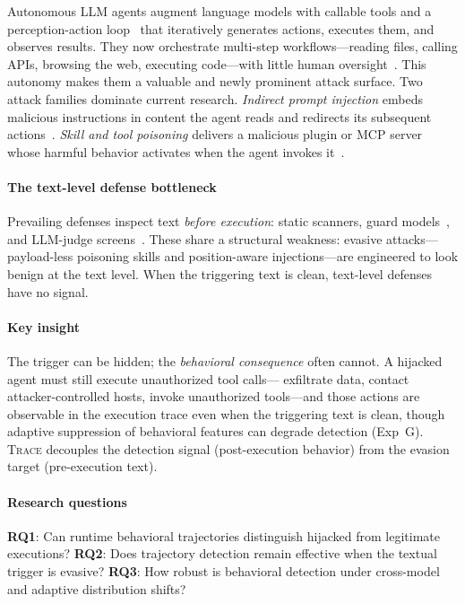 \documentclass[conference]{IEEEtran}
\begin{document}
Autonomous LLM agents augment language models with callable tools and
a perception-action loop~\cite{schick2023toolformer,yao2023react,
guo2024survey} that iteratively generates actions, executes them, and
observes results.  They now orchestrate multi-step workflows---reading
files, calling APIs, browsing the web, executing code---with little
human oversight~\cite{wang2024survey}.  This autonomy
makes them a valuable and newly prominent attack surface.  Two attack
families dominate current research.  \emph{Indirect prompt injection}
embeds malicious instructions in content the agent reads and redirects
its subsequent actions~\cite{greshake2023not,perez2022ignore,
zhan2024injectagent}.  \emph{Skill and tool poisoning} delivers a
malicious plugin or MCP server whose harmful behavior activates when
the agent invokes it~\cite{shi2024badagent,yang2024watch}.

\paragraph{The text-level defense bottleneck}
Prevailing defenses inspect text \emph{before execution}: static
scanners, guard models~\cite{inan2023llama}, and LLM-judge
screens~\cite{yi2023benchmarking}.  These share a structural weakness:
evasive attacks---payload-less poisoning skills and position-aware
injections---are engineered to look benign at the text level.
When the triggering text is clean, text-level defenses have no signal.

\paragraph{Key insight}
The trigger can be hidden; the \emph{behavioral consequence} often
cannot.  A hijacked agent must still execute unauthorized tool calls---
exfiltrate data, contact attacker-controlled hosts, invoke unauthorized
tools---and those actions are observable in the execution trace even
when the triggering text is clean, though adaptive suppression of
behavioral features can degrade detection (Exp~G).
\textsc{Trace} decouples the detection signal (post-execution behavior)
from the evasion target (pre-execution text).

\paragraph{Research questions}
\textbf{RQ1}: Can runtime behavioral trajectories distinguish hijacked
from legitimate executions?
\textbf{RQ2}: Does trajectory detection remain effective when the
textual trigger is evasive?
\textbf{RQ3}: How robust is behavioral detection under cross-model
and adaptive distribution shifts?
\end{document}
